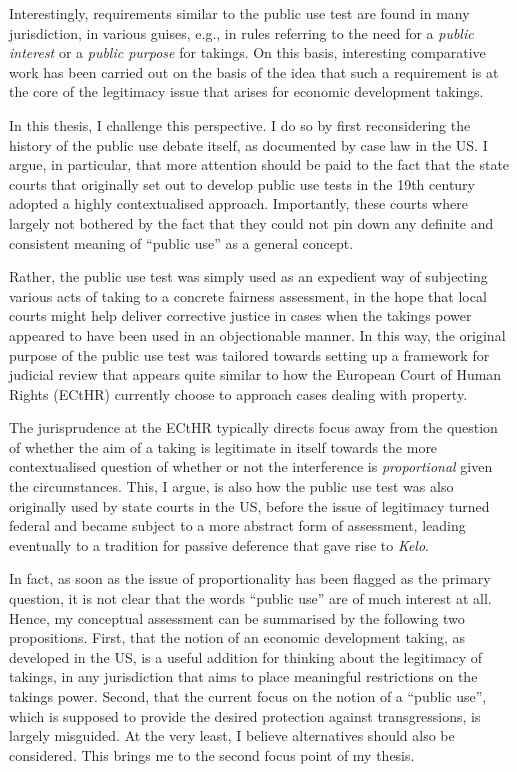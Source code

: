 Interestingly, requirements similar to the public use test are found in many jurisdiction, in various guises, e.g., in rules referring to the need for a {\it public interest} or a {\it public purpose} for takings. On this basis, interesting comparative work has been carried out on the basis of the idea that such a requirement is at the core of the legitimacy issue that arises for economic development takings.

In this thesis, I challenge this perspective. I do so by first reconsidering the history of the public use debate itself, as documented by case law in the US. I argue, in particular, that more attention should be paid to the fact that the state courts that originally set out to develop public use tests in the 19th century adopted a highly contextualised approach. Importantly, these courts where largely not bothered by the fact that they could not pin down any definite and consistent meaning of ``public use'' as a general concept. 

Rather, the public use test was simply used as an expedient way of subjecting various acts of taking to a concrete fairness assessment, in the hope that local courts might help deliver corrective justice in cases when the takings power appeared to have been used in an objectionable manner. In this way, the original purpose of the public use test was tailored towards setting up a framework for judicial review that appears quite similar to how the European Court of Human Rights (ECtHR) currently choose to approach cases dealing with property.

The jurisprudence at the ECtHR typically directs focus away from the question of whether the aim of a taking is legitimate in itself towards the more contextualised question of whether or not the interference is {\it proportional} given the circumstances. This, I argue, is also how the public use test was also originally used by state courts in the US, before the issue of legitimacy turned federal and became subject to a more abstract form of assessment, leading eventually to a tradition for passive deference that gave rise to {\it Kelo}.

In fact, as soon as the issue of proportionality has been flagged as the primary question, it is not clear that the words ``public use'' are of much interest at all. Hence, my conceptual assessment can be summarised by the following two propositions. First, that the notion of an economic development taking, as developed in the US, is a useful addition for thinking about the legitimacy of takings, in any jurisdiction that aims to place meaningful restrictions on the takings power. Second, that the current focus on the notion of a ``public use'', which is supposed to provide the desired protection against transgressions, is largely misguided. At the very least, I believe alternatives should also be considered. This brings me to the second focus point of my thesis.

